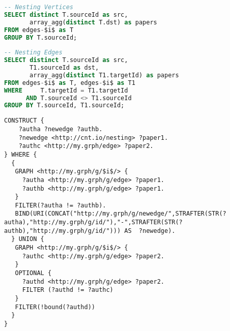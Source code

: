 \begin{lstfloat}[!t]
\begin{lstlisting}[caption={Graph Nesting in PostgreSQL. Two distinct tables are created for both vertices and edges. The nesting is represented by nesting the elements' id within an array (\texttt{array\_agg}). Please note that such sybtax is not SQL-3 standard.},language=SQL,frameround=fttt,frame=trBL,mathescape=true,label=SQLNesting]
-- Nesting Vertices
SELECT distinct T.sourceId as src, 
       array_agg(distinct T.dst) as papers 
FROM edges-$i$ as T 
GROUP BY T.sourceId;
	
-- Nesting Edges
SELECT distinct T.sourceId as src, 
       T1.sourceId as dst, 
       array_agg(distinct T1.targetId) as papers
FROM edges-$i$ as T, edges-$i$ as T1 
WHERE     T.targetId = T1.targetId 
      AND T.sourceId <> T1.sourceId 
GROUP BY T.sourceId, T1.sourceId;
\end{lstlisting}
	
\begin{lstlisting}[caption={Graph Nesting in SPARQL. Given that the RDF List solution is inefficient and that named graphs cannot be used either in the RDF models as vertices or edges, we use other properties to associate to either vertices and edges the nesting content.},language=SPARQL,frameround=fttt,frame=trBL,tabsize=2,mathescape=true,label=SPARQLNesting]
CONSTRUCT {
	?autha ?newedge ?authb.
	?newedge <http://cnt.io/nesting> ?paper1.
	?authc <http://my.grph/edge> ?paper2.
} WHERE {
  {
   GRAPH <http://my.grph/g/$i$/> {
     ?autha <http://my.grph/g/edge> ?paper1.
     ?authb <http://my.grph/g/edge> ?paper1.
   }
   FILTER(?autha != ?authb).
   BIND(URI(CONCAT("http://my.grph/g/newedge/",STRAFTER(STR(?autha),"http://my.grph/g/id/"),"-",STRAFTER(STR(?authb),"http://my.grph/g/id/"))) AS  ?newedge).
  } UNION {
   GRAPH <http://my.grph/g/$i$/> {
     ?authc <http://my.grph/g/edge> ?paper2.
   }
   OPTIONAL {
     ?authd <http://my.grph/g/edge> ?paper2.
     FILTER (?authd != ?authc)
   }
   FILTER(!bound(?authd))
  }
}
\end{lstlisting}
\end{lstfloat}


